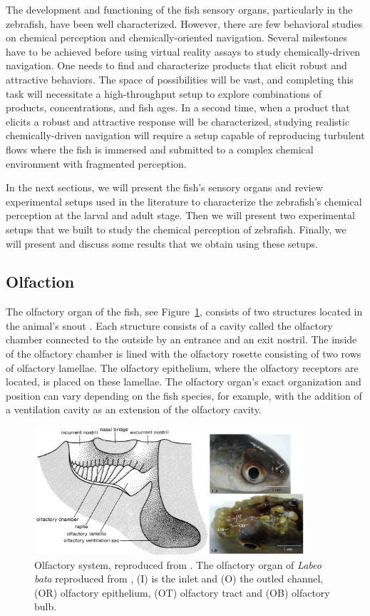   The development and functioning of the fish sensory organs, particularly in the zebrafish, have been well characterized. However, there are few behavioral studies on chemical perception and chemically-oriented navigation. Several milestones have to be achieved before using virtual reality assays to study chemically-driven navigation. One needs to find and characterize products that elicit robust and attractive behaviors. The space of possibilities will be vast, and completing this task will necessitate a high-throughput setup to explore combinations of products, concentrations, and fish ages. In a second time, when a product that elicits a robust and attractive response will be characterized, studying realistic chemically-driven navigation will require a setup capable of reproducing turbulent flows where the fish is immersed and submitted to a complex chemical environment with fragmented perception.

  In the next sections, we will present the fish's sensory organs and review experimental setups used in the literature to characterize the zebrafish's chemical perception at the larval and adult stage. Then we will present two experimental setups that we built to study the chemical perception of zebrafish. Finally, we will present and discuss some results that we obtain using these setups.


    \subsection{Olfaction}
    The olfactory organ of the fish, see Figure~\ref{olfactory_schematic}, consists of two structures located in the animal's snout \cite{hara2012fish}. Each structure consists of a cavity called the olfactory chamber connected to the outside by an entrance and an exit nostril. The inside of the olfactory chamber is lined with the olfactory rosette consisting of two rows of olfactory lamellae. The olfactory epithelium, where the olfactory receptors are located, is placed on these lamellae. The olfactory organ's exact organization and position can vary depending on the fish species, for example, with the addition of a ventilation cavity as an extension of the olfactory cavity.

    \begin{figure}[h]
      \centering
      \includegraphics[width=10cm]{part_2/assets/olfactory_schematic.png}
      \caption{Olfactory system, reproduced from \cite{hara2012fish}. The olfactory organ of \textit{Labeo bata} reproduced from \cite{samajdar2016histological}, (I) is the inlet and (O) the outled channel, (OR) olfactory epithelium, (OT) olfactory tract and (OB) olfactory bulb.}
      \label{olfactory_schematic}
    \end{figure}


